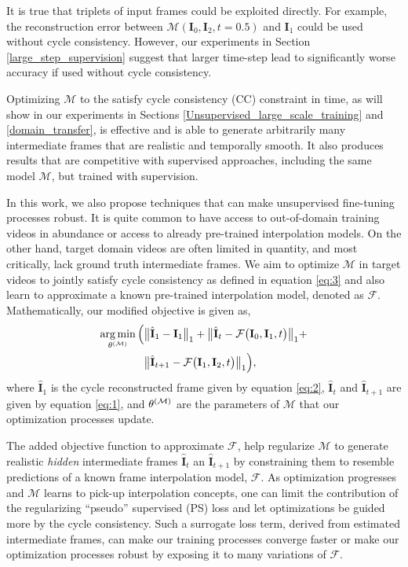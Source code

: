 \documentclass[10pt,twocolumn,letterpaper]{article}
\begin{document}
It is true that triplets of input frames could be exploited directly. For example, the reconstruction error between $\mathcal{M}(\textbf{I}_{0},\textbf{I}_{2},t=0.5)$ and $\textbf{I}_{1}$ could be used without cycle consistency. However, our experiments in Section \ref{large_step_supervision} suggest that larger time-step lead to significantly worse accuracy if used without cycle consistency. 

Optimizing $\mathcal{M}$ to the satisfy cycle consistency (CC) constraint in time, as will show in our experiments in Sections  \ref{Unsupervised_large_scale_training} and \ref{domain_transfer}, is effective and is able to generate arbitrarily many intermediate frames that are realistic and temporally smooth. It also produces results that are competitive with supervised approaches, including the same model $\mathcal{M}$, but trained with supervision.

In this work, we also propose techniques that can make unsupervised fine-tuning processes robust. It is quite common to have access to out-of-domain training videos in abundance or access to already pre-trained interpolation models. On the other hand, target domain videos are often limited in quantity, and most critically, lack ground truth intermediate frames. We aim to optimize $\mathcal{M}$ in target videos to jointly satisfy cycle consistency as defined in equation \ref{eq:3} and also learn to approximate a known pre-trained interpolation model, denoted as $\mathcal{F}$. Mathematically, our modified objective is given as,
\begin{equation} 
\label{eq:4}
\begin{split}
\operatorname*{arg\,min}_{ \bold{\theta}^ { (\mathcal{M}) }  } \Big(
& \big\lVert \hat{\textbf{I}}_{1} - \textbf{I}_{1}\big\rVert_1 + \big\lVert \hat{\textbf{I}}_{t} - \mathcal{F}\big(\textbf{I}_{0},\textbf{I}_{1},t\big) \big\rVert_1 + \\
& \big\lVert \hat{\textbf{I}}_{t+1} - \mathcal{F}\big(\textbf{I}_{1},\textbf{I}_{2},t\big) 
\big\rVert_1
\Big) , 
\end{split}
\end{equation}
where $\hat{\textbf{I}}_{1}$ is the cycle reconstructed frame given by equation \ref{eq:2}, $\hat{\textbf{I}}_{t}$ and $\hat{\textbf{I}}_{t+1}$ are given by equation \ref{eq:1}, and  $\bold{\theta}^{(\mathcal{M})}$ are the parameters of $\mathcal{M}$ that our optimization processes update. 

The added objective function to approximate $\mathcal{F}$, help regularize $\mathcal{M}$ to generate realistic \textit{hidden} intermediate frames $\hat{\textbf{I}}_{t}$ an $\hat{\textbf{I}}_{t+1}$ by constraining them to resemble predictions of a known frame interpolation model, $\mathcal{F}$. As optimization progresses and $\mathcal{M}$ learns to pick-up interpolation concepts, one can limit the contribution of the regularizing ``pseudo'' supervised (PS) loss and let optimizations be guided more by the cycle consistency. Such a surrogate loss term, derived from estimated intermediate frames, can make our training processes converge faster or make our optimization processes robust by exposing it to many variations of $\mathcal{F}$.
\end{document}
